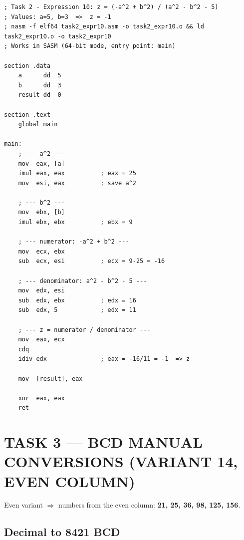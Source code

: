 \documentclass[12pt,a4paper]{article}
\begin{document}
\begin{lstlisting}[caption={task2\_expr10.asm --- Expression 10}]
; Task 2 - Expression 10: z = (-a^2 + b^2) / (a^2 - b^2 - 5)
; Values: a=5, b=3  =>  z = -1
; nasm -f elf64 task2_expr10.asm -o task2_expr10.o && ld task2_expr10.o -o task2_expr10
; Works in SASM (64-bit mode, entry point: main)

section .data
    a      dd  5
    b      dd  3
    result dd  0

section .text
    global main

main:
    ; --- a^2 ---
    mov  eax, [a]
    imul eax, eax          ; eax = 25
    mov  esi, eax          ; save a^2

    ; --- b^2 ---
    mov  ebx, [b]
    imul ebx, ebx          ; ebx = 9

    ; --- numerator: -a^2 + b^2 ---
    mov  ecx, ebx
    sub  ecx, esi          ; ecx = 9-25 = -16

    ; --- denominator: a^2 - b^2 - 5 ---
    mov  edx, esi
    sub  edx, ebx          ; edx = 16
    sub  edx, 5            ; edx = 11

    ; --- z = numerator / denominator ---
    mov  eax, ecx
    cdq
    idiv edx               ; eax = -16/11 = -1  => z

    mov  [result], eax

    xor  eax, eax
    ret
\end{lstlisting}

\newpage
\section{TASK 3 --- BCD MANUAL CONVERSIONS (VARIANT 14, EVEN COLUMN)}

Even variant $\Rightarrow$ numbers from the even column: \textbf{21, 25, 36, 98, 125, 156}.

\subsection{Decimal to 8421 BCD}
\end{document}
